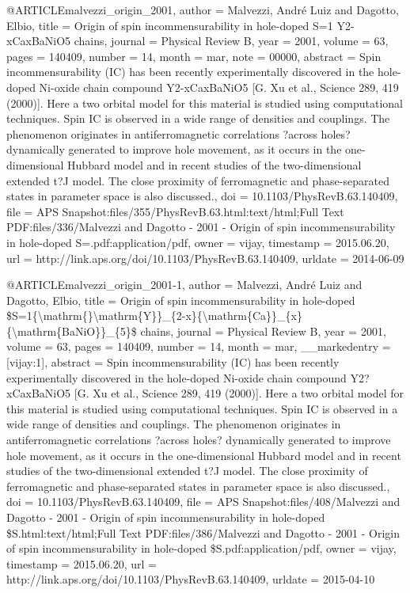 @ARTICLE{malvezzi_origin_2001,
  author = {Malvezzi, André Luiz and Dagotto, Elbio},
  title = {Origin of spin incommensurability in hole-doped {S}=1 {Y}2-{xCaxBaNiO}5
	chains},
  journal = {Physical Review B},
  year = {2001},
  volume = {63},
  pages = {140409},
  number = {14},
  month = mar,
  note = {00000},
  abstract = {Spin incommensurability (IC) has been recently experimentally discovered
	in the hole-doped Ni-oxide chain compound Y2-xCaxBaNiO5 [G. Xu et
	al., Science 289, 419 (2000)]. Here a two orbital model for this
	material is studied using computational techniques. Spin IC is observed
	in a wide range of densities and couplings. The phenomenon originates
	in antiferromagnetic correlations ?across holes? dynamically generated
	to improve hole movement, as it occurs in the one-dimensional Hubbard
	model and in recent studies of the two-dimensional extended t?J model.
	The close proximity of ferromagnetic and phase-separated states in
	parameter space is also discussed.},
  doi = {10.1103/PhysRevB.63.140409},
  file = {APS Snapshot:files/355/PhysRevB.63.html:text/html;Full Text PDF:files/336/Malvezzi and Dagotto - 2001 - Origin of spin incommensurability in hole-doped S=.pdf:application/pdf},
  owner = {vijay},
  timestamp = {2015.06.20},
  url = {http://link.aps.org/doi/10.1103/PhysRevB.63.140409},
  urldate = {2014-06-09}
}

@ARTICLE{malvezzi_origin_2001-1,
  author = {Malvezzi, André Luiz and Dagotto, Elbio},
  title = {Origin of spin incommensurability in hole-doped \${S}=1\{{\textbackslash}mathrm\{\}{\textbackslash}mathrm\{{Y}\}\}\_\{2-x\}\{{\textbackslash}mathrm\{{Ca}\}\}\_\{x\}\{{\textbackslash}mathrm\{{BaNiO}\}\}\_\{5\}\$
	chains},
  journal = {Physical Review B},
  year = {2001},
  volume = {63},
  pages = {140409},
  number = {14},
  month = mar,
  __markedentry = {[vijay:1]},
  abstract = {Spin incommensurability (IC) has been recently experimentally discovered
	in the hole-doped Ni-oxide chain compound Y2?xCaxBaNiO5 [G. Xu et
	al., Science 289, 419 (2000)]. Here a two orbital model for this
	material is studied using computational techniques. Spin IC is observed
	in a wide range of densities and couplings. The phenomenon originates
	in antiferromagnetic correlations ?across holes? dynamically generated
	to improve hole movement, as it occurs in the one-dimensional Hubbard
	model and in recent studies of the two-dimensional extended t?J model.
	The close proximity of ferromagnetic and phase-separated states in
	parameter space is also discussed.},
  doi = {10.1103/PhysRevB.63.140409},
  file = {APS Snapshot:files/408/Malvezzi and Dagotto - 2001 - Origin of spin incommensurability in hole-doped \$S.html:text/html;Full Text PDF:files/386/Malvezzi and Dagotto - 2001 - Origin of spin incommensurability in hole-doped \$S.pdf:application/pdf},
  owner = {vijay},
  timestamp = {2015.06.20},
  url = {http://link.aps.org/doi/10.1103/PhysRevB.63.140409},
  urldate = {2015-04-10}
}

